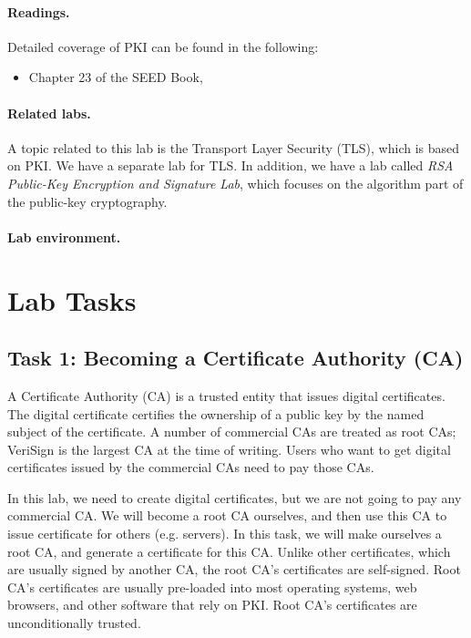 \paragraph{Readings.}
Detailed coverage of PKI can be found in the following:

\begin{itemize}
\item Chapter 23 of the SEED Book, \seedbook
\end{itemize}


\paragraph{Related labs.}
A topic related to this lab is the Transport Layer Security (TLS), which is based on  
PKI. We have a separate lab for TLS.
In addition, we have a lab called \textit{RSA Public-Key Encryption and Signature Lab}, 
which focuses on the algorithm part of the public-key cryptography.


\paragraph{Lab environment.} \seedenvironment 



\section{Lab Tasks}


\subsection{Task 1: Becoming a Certificate Authority (CA)}

A Certificate Authority (CA) is a trusted entity that issues digital certificates. 
The digital certificate certifies the ownership of a public key by 
the named subject of the certificate. A number of commercial 
CAs are treated as root CAs; VeriSign is the largest CA at the time of 
writing. Users who want to get digital certificates issued
by the commercial CAs need to pay those CAs.


In this lab, we need to create digital certificates, but we are not going to pay
any commercial CA. We will become a root CA ourselves, and then use this CA to 
issue certificate for others (e.g. servers). In this task, we will make
ourselves a root CA, and generate a certificate for this CA. Unlike 
other certificates, which are usually signed by another CA, the root CA's 
certificates are self-signed. Root CA's certificates are usually pre-loaded
into most operating systems, web browsers, and other software that rely on PKI.
Root CA's certificates are unconditionally trusted.


